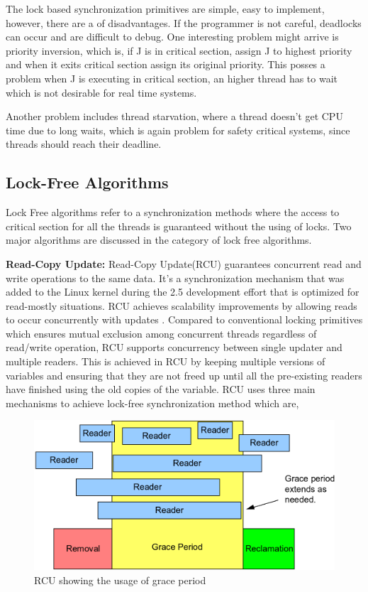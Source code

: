 The lock based synchronization primitives are simple, easy to implement, however, there are a of disadvantages. If the programmer is not careful, deadlocks can occur and are difficult to debug. One interesting problem might arrive is priority inversion,  which is, if J is in critical section, assign J to highest priority and when it exits critical section assign its original priority. This posses a problem when J is executing in critical section, an higher thread has to wait which is not desirable for real time systems. 

Another problem includes thread starvation, where a thread doesn't get CPU time due to long waits, which is again problem for safety critical systems, since threads should reach their deadline.
 
\subsection{Lock-Free Algorithms}

Lock Free algorithms refer to a synchronization methods where the access to critical section for all the threads is guaranteed without the using of locks. Two major algorithms are discussed in the category of lock free algorithms.

\textbf{Read-Copy Update:}
Read-Copy Update(RCU) guarantees concurrent read and write operations to the same data.  It's a synchronization mechanism that was added to the Linux kernel
during the 2.5 development effort that is optimized for read-mostly situations. RCU achieves scalability improvements by allowing reads to occur concurrently with updates \cite{whatisrcu}. Compared to conventional locking primitives which ensures mutual exclusion among concurrent threads regardless of read/write operation, RCU supports concurrency between single updater and multiple readers. This is achieved in RCU by keeping multiple versions of variables and ensuring that they are not freed up until all the pre-existing readers have finished using the old copies of the variable. RCU uses three main mechanisms to achieve lock-free synchronization method which are,

\begin{figure}[h]
\centering
\includegraphics[width=0.7\linewidth]{figures/rcu_grace}
\caption{RCU showing the usage of grace period \cite{whatisrcu}}
\label{fig:rcu_grace}
\end{figure}

